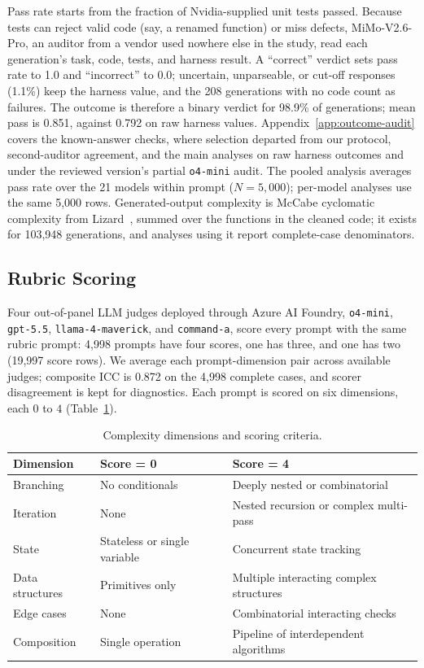 \documentclass{article}
\begin{document}
Pass rate starts from the fraction of Nvidia-supplied unit tests passed. Because tests can reject valid code (say, a renamed function) or miss defects, MiMo-V2.6-Pro, an auditor from a vendor used nowhere else in the study, read each generation's task, code, tests, and harness result. A ``correct'' verdict sets pass rate to 1.0 and ``incorrect'' to 0.0; uncertain, unparseable, or cut-off responses (1.1\%) keep the harness value, and the 208 generations with no code count as failures. The outcome is therefore a binary verdict for 98.9\% of generations; mean pass is 0.851, against 0.792 on raw harness values. Appendix~\ref{app:outcome-audit} covers the known-answer checks, where selection departed from our protocol, second-auditor agreement, and the main analyses on raw harness outcomes and under the reviewed version's partial \texttt{o4-mini} audit. The pooled analysis averages pass rate over the 21 models within prompt ($N=5{,}000$); per-model analyses use the same 5{,}000 rows. Generated-output complexity is McCabe cyclomatic complexity from Lizard~\cite{lizard}, summed over the functions in the cleaned code; it exists for 103{,}948 generations, and analyses using it report complete-case denominators.

\subsection{Rubric Scoring}

Four out-of-panel LLM judges deployed through Azure AI Foundry, \texttt{o4-mini}, \texttt{gpt-5.5}, \texttt{llama-4-maverick}, and \texttt{command-a}, score every prompt with the same rubric prompt: 4{,}998 prompts have four scores, one has three, and one has two (19{,}997 score rows). We average each prompt-dimension pair across available judges; composite ICC is 0.872 on the 4{,}998 complete cases, and scorer disagreement is kept for diagnostics. Each prompt is scored on six dimensions, each $0$ to $4$ (Table~\ref{tab:complexity_dimensions}).
\begin{table}[h]
\caption{Complexity dimensions and scoring criteria.}
\label{tab:complexity_dimensions}
\centering
\begin{tabular}{p{3cm} p{4cm} p{5.5cm}}
\hline
\textbf{Dimension} & \textbf{Score = 0} & \textbf{Score = 4} \\
\hline
Branching & No conditionals & Deeply nested or combinatorial \\
Iteration & None & Nested recursion or complex multi-pass \\
State & Stateless or single variable & Concurrent state tracking \\
Data structures & Primitives only & Multiple interacting complex structures \\
Edge cases & None & Combinatorial interacting checks \\
Composition & Single operation & Pipeline of interdependent algorithms \\
\hline
\end{tabular}
\end{table}
\end{document}
